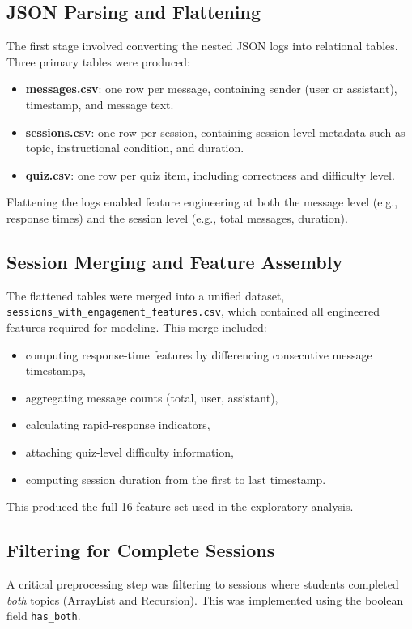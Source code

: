 \documentclass[conference]{IEEEtran}
\begin{document}
\subsection{JSON Parsing and Flattening}
The first stage involved converting the nested JSON logs into relational tables. Three primary tables were produced:

\begin{itemize}[noitemsep]
    \item \textbf{messages.csv}: one row per message, containing sender (user or assistant), timestamp, and message text.
    \item \textbf{sessions.csv}: one row per session, containing session-level metadata such as topic, instructional condition, and duration.
    \item \textbf{quiz.csv}: one row per quiz item, including correctness and difficulty level.
\end{itemize}

Flattening the logs enabled feature engineering at both the message level (e.g., response times) and the session level (e.g., total messages, duration).

\subsection{Session Merging and Feature Assembly}
The flattened tables were merged into a unified dataset, \texttt{sessions\_with\_engagement\_features.csv}, which contained all engineered features required for modeling. This merge included:

\begin{itemize}[noitemsep]
    \item computing response-time features by differencing consecutive message timestamps,
    \item aggregating message counts (total, user, assistant),
    \item calculating rapid-response indicators,
    \item attaching quiz-level difficulty information,
    \item computing session duration from the first to last timestamp.
\end{itemize}

This produced the full 16-feature set used in the exploratory analysis.

\subsection{Filtering for Complete Sessions}
A critical preprocessing step was filtering to sessions where students completed \emph{both} topics (ArrayList and Recursion). This was implemented using the boolean field \texttt{has\_both}.
\end{document}
